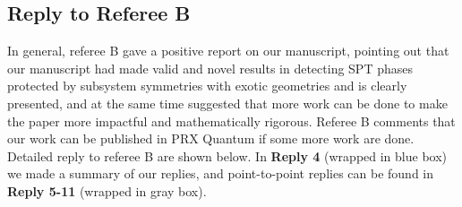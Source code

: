 \documentclass{article}
\begin{document}
\subsection{Reply to Referee B}
In general, referee B gave a positive report on our manuscript, pointing out that our manuscript had made valid and novel results in detecting SPT phases protected by subsystem symmetries with exotic geometries and is clearly presented, and at the same time suggested that more work can be done to make the paper more impactful and mathematically rigorous. Referee B comments that our work can be published in PRX Quantum if some more work are done. Detailed reply to referee B are shown below. In \textbf{Reply 4} (wrapped in {\color{blue}blue box}) we made a summary of our replies, and point-to-point replies can be found in \textbf{Reply 5-11} (wrapped in {\color{gray}gray box}).  
\end{document}
